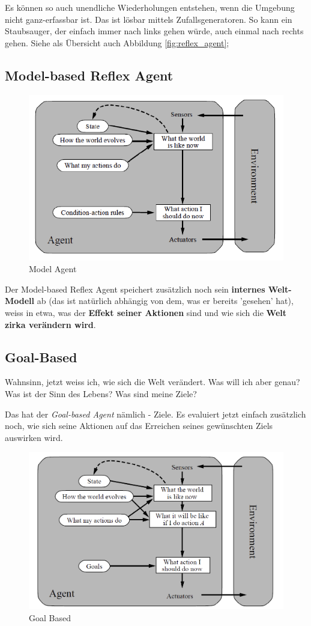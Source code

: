 Es können so auch unendliche Wiederholungen entstehen, wenn die Umgebung nicht ganz-erfassbar ist. Das ist lösbar mittels Zufallsgeneratoren. So kann ein Staubsauger, der einfach immer nach links gehen würde, auch einmal nach rechts gehen. Siehe als Übersicht auch Abbildung \ref{fig:reflex_agent};
\subsection{Model-based Reflex Agent}
\begin{figure}[h]
\centering
\includegraphics[width=0.7\linewidth]{fig/model_agent}
\caption{Model Agent}
\label{fig:model_agent}
\end{figure}
Der Model-based Reflex Agent speichert zusätzlich noch sein \textbf{internes Welt-Modell} ab (das ist natürlich abhängig von dem, was er bereits 'gesehen' hat), weiss in etwa, was der\textbf{ Effekt seiner Aktionen }sind und wie sich die \textbf{Welt zirka verändern wird}. 

\subsection{Goal-Based}
Wahnsinn, jetzt weiss ich, wie sich die Welt verändert. Was will ich aber genau? Was ist der Sinn des Lebens? Was sind meine Ziele? 

Das hat der \textit{Goal-based Agent} nämlich - Ziele. Es evaluiert jetzt einfach zusätzlich noch, wie sich seine Aktionen auf das Erreichen seines gewünschten Ziels auswirken wird.
\begin{figure}[h]
\centering
\includegraphics[width=0.7\linewidth]{fig/goal_agent}
\caption{Goal Based}
\label{fig:goal_agent}
\end{figure}

